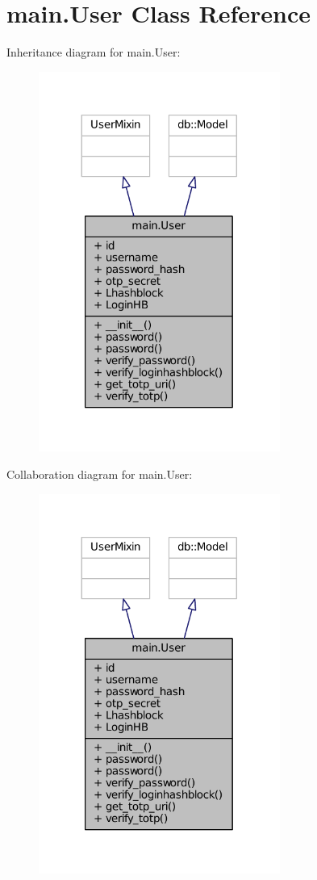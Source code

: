 \hypertarget{classmain_1_1User}{}\section{main.\+User Class Reference}
\label{classmain_1_1User}


Inheritance diagram for main.\+User\+:
\nopagebreak
\begin{figure}[H]
\begin{center}
\leavevmode
\includegraphics[width=224pt]{classmain_1_1User__inherit__graph}
\end{center}
\end{figure}


Collaboration diagram for main.\+User\+:
\nopagebreak
\begin{figure}[H]
\begin{center}
\leavevmode
\includegraphics[width=224pt]{classmain_1_1User__coll__graph}
\end{center}
\end{figure}

